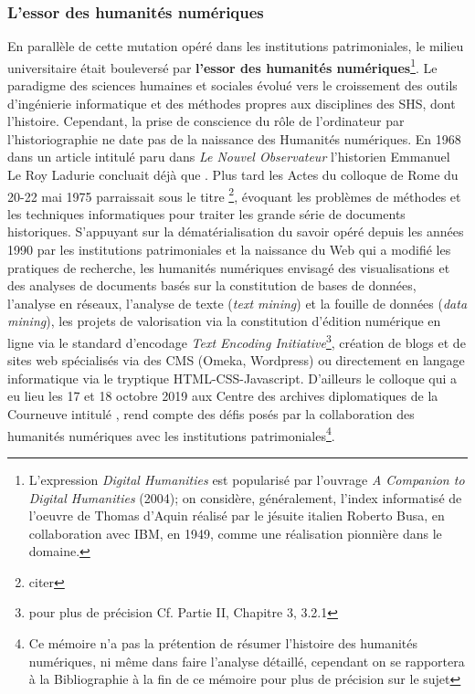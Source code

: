 \subsubsection{L'essor des humanités numériques} 

En parallèle de cette mutation opéré dans les institutions patrimoniales, le milieu universitaire était bouleversé par \textbf{l'essor des humanités numériques}\footnote{L'expression \textit{Digital Humanities} est popularisé par l'ouvrage \textit{A Companion to Digital Humanities} (2004); on considère, généralement,  l'index informatisé de l'oeuvre de Thomas d'Aquin réalisé par le jésuite italien Roberto Busa, en collaboration avec IBM, en 1949, comme une réalisation pionnière dans le domaine.}. Le paradigme des sciences humaines et sociales évolué vers le croissement des outils d'ingénierie informatique et des méthodes propres aux disciplines des SHS, dont l'histoire. Cependant, la prise de conscience du rôle de l'ordinateur par l'historiographie ne date pas de la naissance des Humanités numériques. En 1968 dans un article intitulé  paru dans \textit{Le Nouvel Observateur} l'historien Emmanuel Le Roy Ladurie concluait déjà que . Plus tard les Actes du colloque de Rome du 20-22 mai 1975 parraissait sous le titre \footnote{citer}, évoquant les problèmes de méthodes et les techniques informatiques pour traiter les grande série de documents historiques. S'appuyant sur la dématérialisation du savoir opéré depuis les années 1990 par les institutions patrimoniales et la naissance du Web qui a modifié les pratiques de recherche, les humanités numériques envisagé des visualisations et des analyses de documents basés sur la constitution de bases de données, l'analyse en réseaux, l'analyse de texte (\textit{text mining}) et la fouille de données (\textit{data mining}), les projets de valorisation via la constitution d'édition numérique en ligne via le standard d'encodage \textit{Text Encoding Initiative}\footnote{pour plus de précision Cf. Partie II, Chapitre 3, 3.2.1}, création de blogs et de sites web spécialisés via des CMS (Omeka, Wordpress) ou directement en langage informatique via le tryptique HTML-CSS-Javascript. D'ailleurs le colloque qui a eu lieu les 17 et 18 octobre 2019 aux Centre des archives diplomatiques de la Courneuve intitulé , rend compte des défis posés par la collaboration des humanités numériques avec les institutions patrimoniales\footnote{Ce mémoire n'a pas la prétention de résumer l'histoire des humanités numériques, ni même dans faire l'analyse détaillé, cependant on se rapportera à la Bibliographie à la fin de ce mémoire pour plus de précision sur le sujet}.

